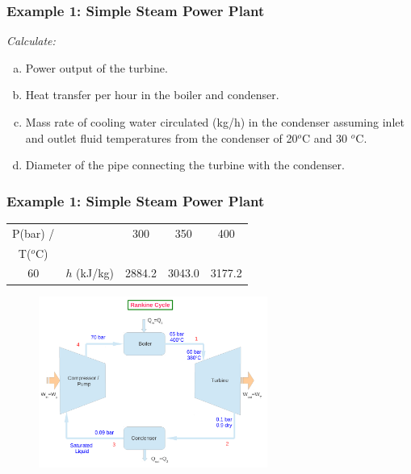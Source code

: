\documentclass[10pt,compress,handout,ignorenonframetext]{beamer}
\begin{document}
\begin{frame}
 \frametitle{Example 1: Simple Steam Power Plant}
    {\it Calculate:
    \begin{enumerate}[(a)]
     \item Power output of the turbine.
     \item Heat transfer per hour in the boiler and condenser.
     \item Mass rate of cooling water circulated (kg/h) in the condenser assuming inlet and outlet fluid temperatures from the condenser of 20$ ^{o}$C and 30 $^{o}$C.
     \item Diameter of the pipe connecting the turbine with the condenser. 
    \end{enumerate}}
 \normalsize
\end{frame}



\begin{frame}
 \frametitle{Example 1: Simple Steam Power Plant}
     
\begin{center}
       \begin{tabular}{|c c c c c|}
         \hline
          P(bar) /   &      &   300       &  350     &  400 \\
          T($^{o}$C) &       &             &         &      \\
          \hline
             60     &  $h$ (kJ/kg)   &   2884.2   & 3043.0   &  3177.2 \\
          \hline
       \end{tabular} 
\end{center}

    \begin{figure}%
     \begin{center}
      \includegraphics[width=7.5cm,clip]{./Pics/Rankine_Cycle_Exemple01}
     \end{center}
    \end{figure} 


 \normalsize
\end{frame}
\end{document}
